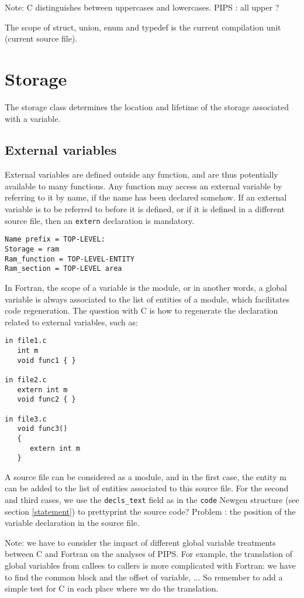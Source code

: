 \documentclass[a4paper]{article}
\begin{document}
Note: C distinguishes between uppercases and lowercases. PIPS : all upper
? 
 
The scope of struct, union, enum and typedef is the current compilation
unit (current source file).
 
\newpage
\section{Storage}
The storage class determines the location and lifetime of the storage
associated with a variable. 
\subsection{External variables}
\label{external}
External variables are defined outside  any function, and are thus
potentially available to many functions. Any function may access an
external variable by referring to it by name, if the name has been
declared somehow. If an external variable is to be referred to before it
is defined, or if it is defined in a different source file, then an
\verb/extern/ declaration is mandatory. 
\begin{verbatim}
Name prefix = TOP-LEVEL:
Storage = ram 
Ram_function = TOP-LEVEL-ENTITY 
Ram_section = TOP-LEVEL area 
\end{verbatim}
In Fortran, the scope of a variable is the module, or in another words, a global variable is always associated to the list of entities
of a module, which facilitates code regeneration. 
The question with C is how to regenerate the declaration related to
external variables, such as: 
\begin{verbatim}
in file1.c
   int m
   void func1 { }

in file2.c 
   extern int m 
   void func2 { }

in file3.c
   void func3() 
   { 
      extern int m
   } 
\end{verbatim}
A source file can be considered as a module, and in the first case, the
entity m can be added to the list of entities associated to this source
file. For the second and third cases, we use the \verb/decls_text/ field
as in the \verb/code/ Newgen structure (see section \ref{statement}) to
prettyprint the source code? Problem : the position of the variable
declaration in the source file. 
 
Note: we have to consider the impact of different 
global variable treatments between C and Fortran on the analyses of PIPS. For example,
the translation of global variables from callees to callers is more
complicated with Fortran: we have to find the common block and the
offset of variable, ... So remember to add a simple test for C in each
place where we do the translation. 
  
\end{document}
